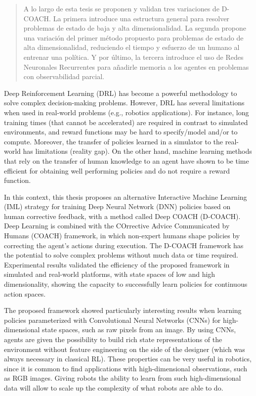 \documentclass[upright, contnum]{umemoria}
\begin{document}
\begin{abstract}
A lo largo de esta tesis se proponen y validan tres variaciones de D-COACH. La primera introduce una estructura general para resolver problemas de estado de baja y alta dimensionalidad. La segunda propone una variación del primer método propuesto para problemas de estado de alta dimensionalidad, reduciendo el tiempo y esfuerzo de un humano al entrenar una política. Y por último, la tercera introduce el uso de Redes Neuronales Recurrentes para añadirle memoria a los agentes en problemas con observabilidad parcial.
\end{abstract}

\begin{abstract_eng}
Deep Reinforcement Learning (DRL) has become a powerful methodology to solve complex decision-making problems. However, DRL has several limitations when used in real-world problems (e.g., robotics applications). For instance, long training times (that cannot be accelerated) are required in contrast to simulated environments, and reward functions may be hard to specify/model and/or to compute. Moreover, the transfer of policies learned in a simulator to the real-world has limitations (reality gap). On the other hand, machine learning methods that rely on the transfer of human knowledge to an agent have shown to be time efficient for obtaining well performing policies and do not require a reward function.

In this context, this thesis proposes an alternative Interactive Machine Learning (IML) strategy for training Deep Neural Network (DNN) policies based on human corrective feedback, with a method called Deep COACH (D-COACH). Deep Learning is combined with the COrrective Advice Communicated by Humans (COACH) framework, in which non-expert humans shape policies by correcting the agent’s actions during execution. The D-COACH framework has the potential to solve complex problems without much data or time required. Experimental results validated the efficiency of the proposed framework in simulated and real-world platforms, with state spaces of low and high dimensionality, showing the capacity to successfully learn policies for continuous action spaces. 

The proposed framework showed particularly interesting results when learning policies parameterized with Convolutional Neural Networks (CNNs) for high-dimensional state spaces, such as raw pixels from an image. By using CNNs, agents are given the possibility to build rich state representations of the environment without feature engineering on the side of the designer (which was always necessary in classical RL). These properties can be very useful in robotics, since it is common to find applications with high-dimensional observations, such as RGB images. Giving robots the ability to learn from such high-dimensional data will allow to scale up the complexity of what robots are able to do.


\end{abstract_eng}
\end{document}
